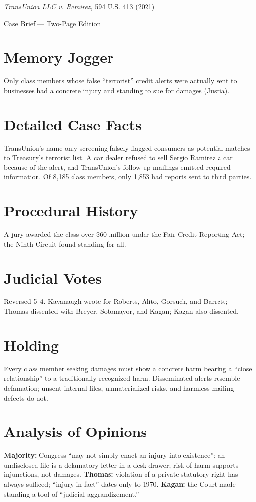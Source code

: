 \documentclass[12pt]{article}
\begin{document}
\begin{center}
{\LARGE \textit{TransUnion LLC v. Ramirez}, 594 U.S. 413 (2021)\par}
\vspace{0.5em}
{\large Case Brief --- Two-Page Edition\par}
\end{center}

\section{Memory Jogger}
Only class members whose false ``terrorist'' credit alerts were actually sent to businesses had a concrete injury and standing to sue for damages (\href{https://supreme.justia.com/cases/federal/us/594/20-297/}{Justia}).

\section{Detailed Case Facts}
TransUnion's name-only screening falsely flagged consumers as potential matches to Treasury's terrorist list. A car dealer refused to sell Sergio Ramirez a car because of the alert, and TransUnion's follow-up mailings omitted required information. Of 8,185 class members, only 1,853 had reports sent to third parties.

\section{Procedural History}
A jury awarded the class over \$60 million under the Fair Credit Reporting Act; the Ninth Circuit found standing for all.

\section{Judicial Votes}
Reversed 5--4. Kavanaugh wrote for Roberts, Alito, Gorsuch, and Barrett; Thomas dissented with Breyer, Sotomayor, and Kagan; Kagan also dissented.

\section{Holding}
Every class member seeking damages must show a concrete harm bearing a ``close relationship'' to a traditionally recognized harm. Disseminated alerts resemble defamation; unsent internal files, unmaterialized risks, and harmless mailing defects do not.

\section{Analysis of Opinions}
\textbf{Majority:} Congress ``may not simply enact an injury into existence''; an undisclosed file is a defamatory letter in a desk drawer; risk of harm supports injunctions, not damages. \textbf{Thomas:} violation of a private statutory right has always sufficed; ``injury in fact'' dates only to 1970. \textbf{Kagan:} the Court made standing a tool of ``judicial aggrandizement.''
\end{document}
